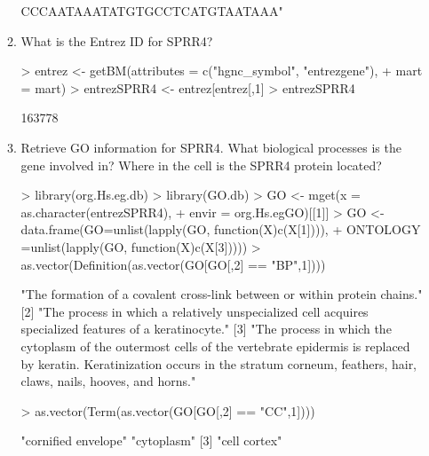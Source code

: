 \documentclass[12pt,a4paper]{paper}
\begin{document}
\begin{enumerate}
\begin{enumerate}
\begin{Schunk}
\begin{Soutput}
     CCCAATAAATATGTGCCTCATGTAATAAA"
\end{Soutput}
\end{Schunk}
\item What is the Entrez ID for SPRR4?
\begin{Schunk}
\begin{Sinput}
> entrez <- getBM(attributes = c("hgnc_symbol", "entrezgene"), 
+                 mart = mart)
> entrezSPRR4 <- entrez[entrez[,1] %in% "SPRR4",2]
> entrezSPRR4
\end{Sinput}
\begin{Soutput}
[1] 163778
\end{Soutput}
\end{Schunk}
\item Retrieve GO information for SPRR4. What biological processes is the gene involved in?
Where in the cell is the SPRR4 protein located?
\begin{Schunk}
\begin{Sinput}
> library(org.Hs.eg.db)
> library(GO.db)
> GO <- mget(x = as.character(entrezSPRR4), 
+            envir = org.Hs.egGO)[[1]]
> GO <- data.frame(GO=unlist(lapply(GO, function(X){c(X[1])})), 
+                  ONTOLOGY =unlist(lapply(GO, function(X){c(X[3])})))
> as.vector(Definition(as.vector(GO[GO[,2] == "BP",1])))
\end{Sinput}
\begin{Soutput}
[1] "The formation of a covalent cross-link between or within protein 
     chains."                                                                                                                                    
[2] "The process in which a relatively unspecialized cell acquires 
     specialized features of a keratinocyte."                                                                                                       
[3] "The process in which the cytoplasm of the outermost cells of the 
     vertebrate epidermis is replaced by keratin. Keratinization occurs 
     in the stratum corneum, feathers, hair, claws, nails, hooves, 
     and horns."
\end{Soutput}
\begin{Sinput}
> as.vector(Term(as.vector(GO[GO[,2] == "CC",1])))
\end{Sinput}
\begin{Soutput}
[1] "cornified envelope" "cytoplasm"         
[3] "cell cortex"       
\end{Soutput}
\end{Schunk}
\end{enumerate}

\end{enumerate}
\end{document}
